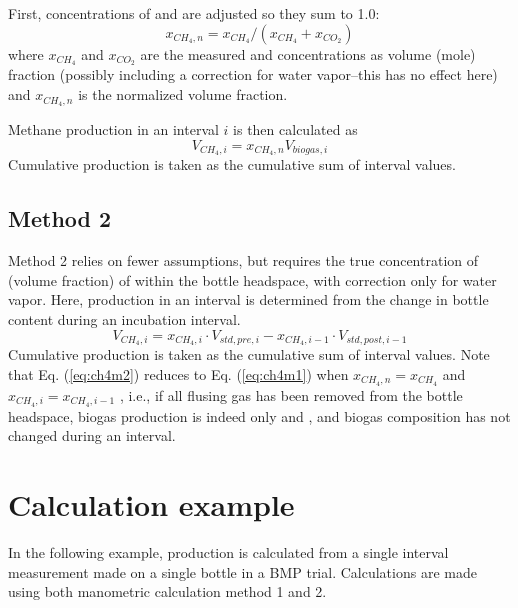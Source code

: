 \documentclass[]{article}
\begin{document}
First, concentrations of  and  are adjusted so they sum to 1.0:
\begin{equation}
  x_{CH_4, n} = x_{CH_4}/(x_{CH_4} + x_{CO_2})
\end{equation}
where $x_{CH_4}$ and $x_{CO_2}$ are the measured  and  concentrations as volume (mole) fraction (possibly including a correction for water vapor--this has no effect here) and $x_{CH_4, n}$ is the normalized  volume fraction.

Methane production in an interval $i$ is then calculated as
\begin{equation}
  \label{eq:ch4m1}
  V_{CH_4, i} = x_{CH_4, n} V_{biogas, i}
\end{equation}
Cumulative production is taken as the cumulative sum of interval values. 

\subsection{Method 2}
Method 2 relies on fewer assumptions, but requires the true concentration of  (volume fraction) of  within the bottle headspace, with correction only for water vapor.
Here,  production in an interval is determined from the change in bottle  content during an incubation interval.
\begin{equation}
  \label{eq:ch4m2}
  V_{CH_4, i} = x_{CH_4, i} \cdot V_{std, pre, i} - x_{CH_4, i - 1} \cdot V_{std, post, i - 1}
\end{equation}
Cumulative production is taken as the cumulative sum of interval values. 
Note that Eq. (\ref{eq:ch4m2}) reduces to Eq. (\ref{eq:ch4m1}) when $x_{CH_4, n} = x_{CH_4}$ and $x_{CH_4, i} = x_{CH_4, i - 1}$ , i.e., if all flusing gas has been removed from the bottle headspace, biogas production is indeed only  and , and biogas composition has not changed during an interval.

\section{Calculation example}
In the following example,  production is calculated from a single interval measurement made on a single bottle in a BMP trial. Calculations are made using both manometric calculation method 1 and 2. 
\end{document}
